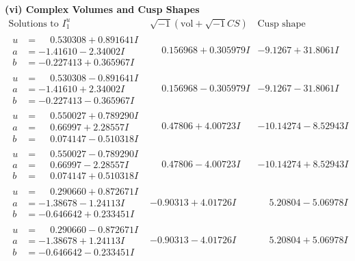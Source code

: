 \documentclass[1p]{elsarticle_modified}
\theoremstyle{definition}
\newcommand{\I}{\sqrt{-1}}
\begin{document}
\newpage\flushleft \textbf{(vi) Complex Volumes and Cusp Shapes}
$$\begin{array}{c|c|c}  
\text{Solutions to }I^u_{1}& \I (\text{vol} + \sqrt{-1}CS) & \text{Cusp shape}\\
 \hline 
\begin{aligned}
u &= \phantom{-}0.530308 + 0.891641 I \\
a &= -1.41610 - 2.34002 I \\
b &= -0.227413 + 0.365967 I\end{aligned}
 & \phantom{-}0.156968 + 0.305979 I & -9.1267 + 31.8061 I \\ \hline\begin{aligned}
u &= \phantom{-}0.530308 - 0.891641 I \\
a &= -1.41610 + 2.34002 I \\
b &= -0.227413 - 0.365967 I\end{aligned}
 & \phantom{-}0.156968 - 0.305979 I & -9.1267 - 31.8061 I \\ \hline\begin{aligned}
u &= \phantom{-}0.550027 + 0.789290 I \\
a &= \phantom{-}0.66997 + 2.28557 I \\
b &= \phantom{-}0.074147 - 0.510318 I\end{aligned}
 & \phantom{-}0.47806 + 4.00723 I & -10.14274 - 8.52943 I \\ \hline\begin{aligned}
u &= \phantom{-}0.550027 - 0.789290 I \\
a &= \phantom{-}0.66997 - 2.28557 I \\
b &= \phantom{-}0.074147 + 0.510318 I\end{aligned}
 & \phantom{-}0.47806 - 4.00723 I & -10.14274 + 8.52943 I \\ \hline\begin{aligned}
u &= \phantom{-}0.290660 + 0.872671 I \\
a &= -1.38678 - 1.24113 I \\
b &= -0.646642 + 0.233451 I\end{aligned}
 & -0.90313 + 4.01726 I & \phantom{-}5.20804 - 5.06978 I \\ \hline\begin{aligned}
u &= \phantom{-}0.290660 - 0.872671 I \\
a &= -1.38678 + 1.24113 I \\
b &= -0.646642 - 0.233451 I\end{aligned}
 & -0.90313 - 4.01726 I & \phantom{-}5.20804 + 5.06978 I \\ \hline\begin{aligned}

\end{aligned}
\end{array}$$
\end{document}
